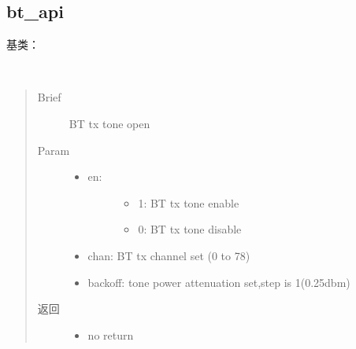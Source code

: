 \documentclass[letterpaper,10pt,english]{sphinxhowto}
\begin{document}
\subsection{bt\_api}
\label{\detokenize{rfapi/index:module-bt_api}}\label{\detokenize{rfapi/index:bt-api}}

\begin{fulllineitems}
\label{\detokenize{rfapi/index:bt_api.BTAPI}}
基类：

\begin{fulllineitems}
\label{\detokenize{rfapi/index:bt_api.BTAPI.bt_tx_tone}}~\begin{quote}\begin{description}
\item[{Brief}] \leavevmode
BT tx tone open

\item[{Param}] \leavevmode\begin{itemize}
\item {} \begin{description}
\item[{en:}] \leavevmode\begin{itemize}
\item {} 
1: BT tx tone enable

\item {} 
0: BT tx tone disable

\end{itemize}

\end{description}

\item {} 
chan: BT tx channel set (0 to 78)

\item {} 
backoff: tone power attenuation set,step is 1(0.25dbm)

\end{itemize}

\item[{返回}] \leavevmode
\begin{itemize}
\item {} 
no return


\end{itemize}
\end{description}
\end{quote}
\end{fulllineitems}
\end{fulllineitems}
\end{document}

